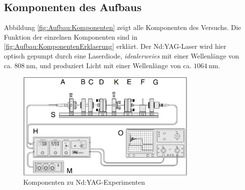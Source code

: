 \documentclass[../main.tex]{subfiles}
\begin{document}
    \subsection{Komponenten des Aufbaus}\label{sec:Aufbau:Komponenten}
        Abbildung \ref{fig:Aufbau:Komponenten} zeigt alle Komponenten des Versuchs. Die Funktion der einzelnen Komponenten sind in \ref{fig:Aufbau:KomponentenErklaerung} erklärt. Der Nd:YAG-Laser wird hier optisch gepumpt durch eine Laserdiode, \textit{idealerweies} mit einer Wellenlänge von ca. $\SI{808}{\nano\metre}$, und produziert Licht mit einer Wellenlänge von ca. $\SI{1064}{\nano\metre}$.
        \begin{figure}[H]
            \centering
            \includegraphics[width=0.8\textwidth]{Bilddateien/Versuchsaufbau/Komponenten.jpg}
            \caption{Komponenten zu Nd:YAG-Experimenten}
            \label{fig:Aubau:Komponenten}
        \end{figure}
\end{document}

